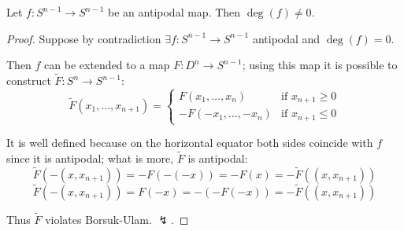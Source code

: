 \documentclass[10pt]{article}
\begin{document}
\begin{theorem}
	Let $f:S^{n-1} \rightarrow S^{n-1}$ be an antipodal map. Then $\deg(f) \neq 0$.
\end{theorem}
\begin{proof}
	Suppose by contradiction $\exists f:S^{n-1} \rightarrow S^{n-1}$ antipodal and $\deg(f)=0$.

	Then $f$ can be extended to a map $F:D^n \rightarrow S^{n-1}$; using this map it is possible to construct $\tilde F: S^n\rightarrow S^{n-1}$:
	\[
		\tilde F(x_1, \dots, x_{n+1})=
		\begin{cases}
			F(x_1, \dots, x_n) & \mbox{if }x_{n+1} \geq 0\\
			-F(-x_1, \dots, -x_n) & \mbox{if }x_{n+1} \leq 0
		\end{cases}
	\]

	It is well defined because on the horizontal equator both sides coincide with $f$ since it is antipodal; what is more, $\tilde F$ is antipodal:
	\[
		\tilde F(-(x, x_{n+1})) = -F(-(-x)) = -F(x) = - \tilde F((x, x_{n+1}))
	\]
	\[
		\tilde F(-(x, x_{n+1})) = F(-x) = - (-F(-x)) = - \tilde F((x, x_{n+1}))
	\]

	Thus $\tilde F$ violates Borsuk-Ulam. $\lightning$.

\end{proof}
\end{document}
